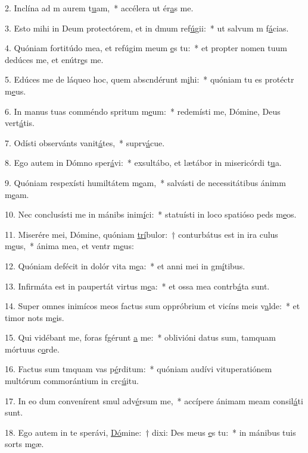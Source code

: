 2. Inclína ad m aurem t\uline{u}am,~* accélera ut ér\uline{a}s me.\par 
3. Esto mihi in Deum protectórem, et in dmum ref\uline{ú}gii:~* ut salvum m f\uline{á}cias.\par 
4. Quóniam fortitúdo mea, et refúgim meum \uline{e}s tu:~* et propter nomen tuum dedúces me, et enútr\uline{e}s me.\par 
5. Edúces me de láqueo hoc, quem abscndérunt m\uline{i}hi:~* quóniam tu es protéctr m\uline{e}us.\par 
6. In manus tuas comméndo spritum m\uline{e}um:~* redemísti me, Dómine, Deus vert\uline{á}tis.\par 
7. Odísti observánts vanit\uline{á}tes,~* suprv\uline{á}cue.\par 
8. Ego autem in Dómno sper\uline{á}vi:~* exsultábo, et lætábor in misericórdi t\uline{u}a.\par 
9. Quóniam respexísti humiltátem m\uline{e}am,~* salvásti de necessitátibus ánimm m\uline{e}am.\par 
10. Nec conclusísti me in mánibs inim\uline{í}ci:~* statuísti in loco spatióso peds m\uline{e}os.\par 
11. Miserére mei, Dómine, quóniam \uline{trí}bulor:~† conturbátus est in ira culus m\uline{e}us,~* ánima mea, et ventr m\uline{e}us:\par 
12. Quóniam defécit in dolór vita m\uline{e}a:~* et anni mei in gm\uline{í}tibus.\par 
13. Infirmáta est in paupertát virtus m\uline{e}a:~* et ossa mea contrb\uline{á}ta sunt.\par 
14. Super omnes inimícos meos factus sum oppróbrium et vicíns meis v\uline{a}lde:~* et timor nots m\uline{e}is.\par 
15. Qui vidébant me, foras fgérunt \uline{a} me:~* oblivióni datus sum, tamquam mórtuus  c\uline{o}rde.\par 
16. Factus sum tmquam vas p\uline{é}rditum:~* quóniam audívi vituperatiónem multórum commorántium in crc\uline{ú}itu.\par 
17. In eo dum convenírent smul adv\uline{é}rsum me,~* accípere ánimam meam consil\uline{á}ti sunt.\par 
18. Ego autem in te sperávi, \uline{Dó}mine:~† dixi: Des meus \uline{e}s tu:~* in mánibus tuis sorts m\uline{e}æ.\par 
